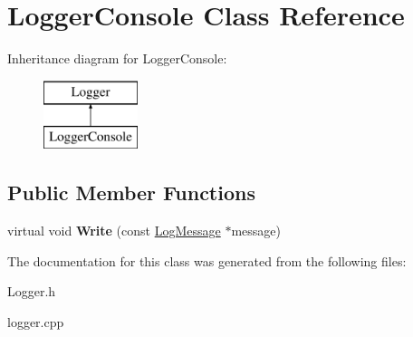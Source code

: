 \hypertarget{class_logger_console}{\section{Logger\-Console Class Reference}
\label{class_logger_console}
}
Inheritance diagram for Logger\-Console\-:\begin{figure}[H]
\begin{center}
\leavevmode
\includegraphics[height=2.000000cm]{class_logger_console}
\end{center}
\end{figure}
\subsection*{Public Member Functions}
\begin{DoxyCompactItemize}
\item 
\hypertarget{class_logger_console_a9ce9d2e57b1c8a097aebb518d0b40496}{virtual void {\bfseries Write} (const \hyperlink{class_log_message}{Log\-Message} $\ast$message)}\label{class_logger_console_a9ce9d2e57b1c8a097aebb518d0b40496}

\end{DoxyCompactItemize}


The documentation for this class was generated from the following files\-:\begin{DoxyCompactItemize}
\item 
Logger.\-h\item 
logger.\-cpp\end{DoxyCompactItemize}
